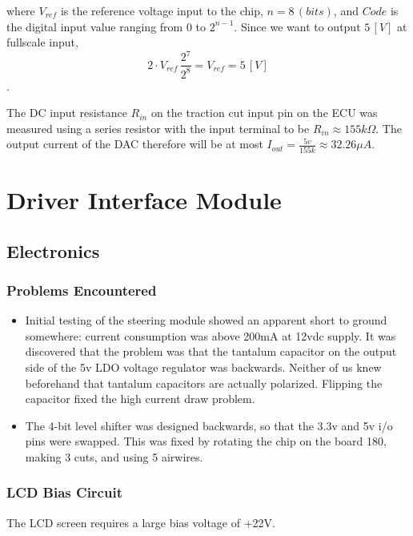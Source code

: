 where $V_{ref}$ is the reference voltage input to the chip, $n=8\,(bits)$,
and $Code$ is the digital input value ranging from $0$ to $2^{n-1}$.
Since we want to output $5\,[V]$ at fullscale input, \begin{equation}
2\cdot{V_{ref}}\,\frac{2^{7}}{2^{8}}=V_{ref}=5\,[V]\end{equation}
.

The DC input resistance $R_{in}$ on the traction cut input pin on
the ECU was measured using a series resistor with the input terminal
to be $R_{in}\approx155k\Omega$. The output current of the DAC therefore
will be at most $I_{out}=\frac{5v}{155k}\approx32.26\mu A$.

\chapter{Driver Interface Module}

\label{chap:driver}


\section{Electronics}


\subsection{Problems Encountered}
\begin{itemize}
\item Initial testing of the steering module showed an apparent short to
ground somewhere: current consumption was above 200mA at 12vdc supply.
It was discovered that the problem was that the tantalum capacitor
on the output side of the 5v LDO voltage regulator was backwards.
Neither of us knew beforehand that tantalum capacitors are actually
polarized. Flipping the capacitor fixed the high current draw problem.
\item The 4-bit level shifter was designed backwards, so that the 3.3v and
5v i/o pins were swapped. This was fixed by rotating the chip on the
board 180\textdegree{}, making 3 cuts, and using 5 airwires. 
\end{itemize}

\subsection{LCD Bias Circuit}

The LCD screen requires a large bias voltage of +22V.

